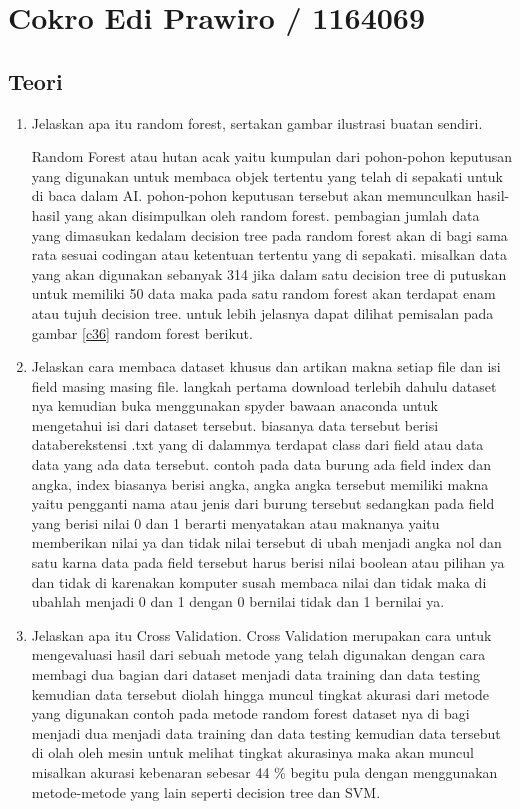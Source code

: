 \section{Cokro Edi Prawiro / 1164069}

\subsection{Teori}
\begin{enumerate}
\item Jelaskan apa itu random forest, sertakan gambar ilustrasi buatan sendiri.\par
Random Forest atau hutan acak yaitu kumpulan dari pohon-pohon keputusan yang digunakan untuk membaca objek tertentu yang telah di sepakati untuk di baca dalam AI. pohon-pohon keputusan tersebut akan memunculkan hasil-hasil yang akan disimpulkan oleh random forest. pembagian jumlah data yang dimasukan kedalam decision tree pada random forest akan di bagi sama rata sesuai codingan atau ketentuan tertentu yang di sepakati. misalkan data yang akan digunakan sebanyak 314 jika dalam satu decision tree di putuskan untuk memiliki 50 data maka pada satu random forest akan terdapat enam atau tujuh decision tree. untuk lebih jelasnya dapat dilihat pemisalan pada gambar \ref{c36} random forest berikut.


\item Jelaskan cara membaca dataset khusus dan artikan makna setiap file dan isi field masing masing file.
langkah pertama download terlebih dahulu dataset nya kemudian buka menggunakan spyder bawaan anaconda untuk mengetahui isi dari dataset tersebut. biasanya data tersebut berisi databerekstensi .txt yang di dalammya terdapat class dari field atau data data yang ada data tersebut. contoh pada data burung ada field index dan angka, index biasanya berisi angka, angka angka tersebut memiliki makna yaitu pengganti nama atau jenis dari burung tersebut sedangkan pada field yang berisi nilai 0 dan 1 berarti menyatakan atau maknanya yaitu memberikan nilai ya dan tidak nilai tersebut di ubah menjadi angka nol dan satu karna data pada field tersebut harus berisi nilai boolean atau pilihan ya dan tidak di karenakan komputer susah membaca nilai dan tidak maka di ubahlah menjadi 0 dan 1 dengan 0 bernilai tidak dan 1 bernilai ya.

\item Jelaskan apa itu Cross Validation.
Cross Validation merupakan cara untuk mengevaluasi hasil dari sebuah metode yang telah digunakan dengan cara membagi dua bagian dari dataset menjadi data training dan data testing kemudian data tersebut diolah hingga muncul tingkat akurasi dari metode yang digunakan contoh pada metode random forest dataset nya di bagi menjadi dua menjadi data training dan data testing kemudian data tersebut di olah oleh mesin untuk melihat tingkat akurasinya maka akan muncul misalkan akurasi kebenaran sebesar 44 \% begitu pula dengan menggunakan metode-metode yang lain seperti decision tree dan SVM.



\end{enumerate}
